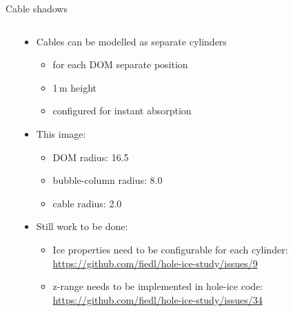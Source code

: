 
\begin{frame}[fragile]{Cable shadows}

  \begin{columns}
    \begin{column}{0.5\textwidth}


    \end{column}
    \begin{column}{0.5\textwidth}

      \begin{itemize}
        \item Cables can be modelled as separate cylinders
          \begin{itemize}
            \item for each DOM separate position
            \item 1\,m height
            \item configured for instant absorption
          \end{itemize}
        \item This image:
          \begin{itemize}
            \item DOM radius: 16.5\cm
            \item bubble-column radius: 8.0\cm
            \item cable radius: 2.0\cm
          \end{itemize}
        \item Still work to be done:
          \begin{itemize}
            \item Ice properties need to be configurable for each cylinder:
                \tiny \url{https://github.com/fiedl/hole-ice-study/issues/9} \small
            \item z-range needs to be implemented in hole-ice code:
                \tiny \url{https://github.com/fiedl/hole-ice-study/issues/34} \small
          \end{itemize}
      \end{itemize}


    \end{column}
  \end{columns}

\end{frame}